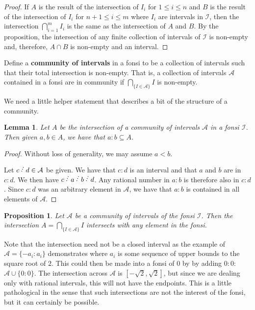 \documentclass[12pt]{article}
\newtheorem{lemma}{Lemma}[subsection]
\newtheorem{proposition}{Proposition}[subsection]
\begin{document}
\begin{proof}
    If $A$ is the result of the intersection of $I_i$ for $1 \leq i \leq n$ and $B$ is the result of the intersection of $I_i$ for $n+1 \leq i \leq m$ where $I_i$ are intervals in $\mathcal{I}$, then the intersection $\bigcap_{i=1}^m I_i$ is the same as the intersection of $A$ and $B$. By the proposition, the intersection of any finite collection of intervals of $\mathcal{I}$ is non-empty and, therefore, $A \cap B$ is non-empty and an interval. 
\end{proof}

Define a \textbf{community of intervals} in a fonsi to be  a collection of intervals such that their total intersection is non-empty. That is, a collection of intervals $\mathcal{A}$ contained in a fonsi are in community if $\bigcap_{\{I \in \mathcal{A}\}} I$ is non-empty. 

We need a little helper statement that describes a bit of the structure of a community.

\begin{lemma}
    Let $A$ be the intersection of a community of intervals $\mathcal{A}$ in a fonsi $\mathcal{I}$. Then given $a, b \in A$, we have that $a : b \subseteq A$.
\end{lemma}

\begin{proof}
    Without loss of generality, we may assume $a < b$.
    
    Let $c\lte d \in \mathcal{A}$ be given. We have that $c:d$ is an interval and that $a$ and $b$ are in $c:d$.   We then have $c \lte a \lte b \lte d$. Any rational number in $a:b$ is therefore also in $c:d$. Since $c:d$ was an arbitrary element in $\mathcal{A}$, we have that $a:b$ is contained in all elements of $\mathcal{A}$.
\end{proof}

\begin{proposition}\label{pr:fonsi-inf-inter}
Let $\mathcal{A}$ be a community of intervals of the fonsi $\mathcal{I}$. Then the intersection $A = \bigcap_{\{ I \in \mathcal{A}\}} I $ intersects with any element in the fonsi. 
\end{proposition}


Note that the intersection need not be a closed interval as the example of $\mathcal{A} = \{ -a_i : a_i \}$ demonstrates where $a_i$ is some sequence of upper bounds to the square root of $2$. This could then be made into a fonsi of 0 by by adding $0:0$:  $\mathcal{A} \cup \{0:0\}$. The intersection across $\mathcal{A}$ is $[-\sqrt{2}, \sqrt{2}]$, but since we are dealing only with rational intervals, this will not have the endpoints. This is a little pathological in the sense that such intersections are not the interest of the fonsi, but it can certainly be possible. 
\end{document}

